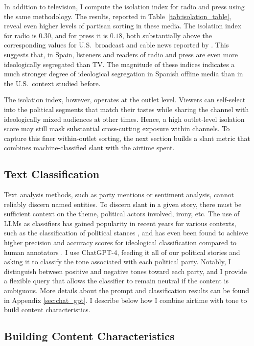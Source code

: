 \documentclass[12pt]{article}
\begin{document}
In addition to television, I compute the isolation index for radio and press using the same methodology. The results, reported in Table~\ref{tab:isolation_table}, reveal even higher levels of partisan sorting in these media. The isolation index for radio is $0.30$, and for press it is $0.18$, both substantially above the corresponding values for U.S.\ broadcast and cable news reported by \citet{gentzkow_isolation}. This suggests that, in Spain, listeners and readers of radio and press are even more ideologically segregated than TV.  The magnitude of these indices indicates a much stronger degree of ideological segregation in Spanish offline media than in the U.S.\ context studied before.  
	
	The isolation index, however, operates at the outlet level.  
	Viewers can self-select into the political segments that match their tastes while sharing the channel with ideologically mixed audiences at other times.  
	Hence, a high outlet-level isolation score may still mask substantial cross-cutting exposure within channels.  
	To capture this finer within-outlet sorting, the next section builds a slant metric that combines machine-classified slant with the airtime spent.
	
	
	\subsection{Text Classification}
	
	Text analysis methods, such as party mentions or sentiment analysis, cannot reliably discern named entities. To discern slant in a given story, there must be sufficient context on the theme, political actors involved, irony, etc. The use of LLMs as classifiers has gained popularity in recent years for various contexts, such as the classification of political stances \citep{lemens}, and has even been found to achieve higher precision and accuracy scores for ideological classification compared to human annotators \citep{tornberg2023}. I use ChatGPT-4, feeding it all of our political stories and asking it to classify the tone associated with each political party. Notably, I distinguish between positive and negative tones toward each party, and I provide a flexible query that allows the classifier to remain neutral if the content is ambiguous. More details about the prompt and classification results can be found in Appendix \ref{sec:chat_gpt}. I describe below how I combine airtime with tone to build content characteristics.
	
	\subsection*{Building Content Characteristics}
	
\end{document}
